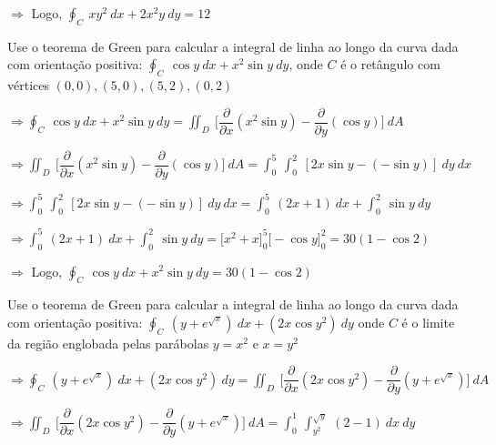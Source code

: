 \documentclass[11pt,a4paper]{article}
\begin{document}
\begin{enumerate}
{		$\Rightarrow$ Logo, $\displaystyle\oint_C\ xy^2\ dx + 2x^2y\ dy = 12$
		
		\item Use o teorema de Green para calcular a integral de linha ao longo da curva dada com orientação positiva: $\displaystyle\oint_C\ \cos y\ dx + x^2 \sin y\ dy$, onde $C$ é o retângulo com vértices $(0,0),(5,0),(5,2),(0,2)$
		
		$\Rightarrow \displaystyle\oint_C\ \cos y\ dx + x^2 \sin y\ dy = \displaystyle\iint_D\ \Bigg[\dfrac{\partial}{\partial x}(x^2\sin y) - \dfrac{\partial}{\partial y}(\cos y)\Bigg]\ dA $
		
		$\Rightarrow \displaystyle\iint_D\ \Bigg[\dfrac{\partial}{\partial x}(x^2\sin y) - \dfrac{\partial}{\partial y}(\cos y)\Bigg]\ dA = \displaystyle\int_{0}^{5}\ \displaystyle\int_{0}^{2}\ [2x\sin y - (-\sin y)]\ dy\ dx$
		
		$\Rightarrow \displaystyle\int_{0}^{5}\ \displaystyle\int_{0}^{2}\ [2x\sin y - (-\sin y)]\ dy\ dx = \displaystyle\int_{0}^{5}\ (2x + 1)\ dx + \displaystyle\int_{0}^{2}\ \sin y\ dy  $
		
		$\Rightarrow \displaystyle\int_{0}^{5}\ (2x + 1)\ dx + \displaystyle\int_{0}^{2}\ \sin y\ dy = \Big[x^2 + x\Big]_0^5 \Big[ - \cos y\Big]_0^2 = 30(1 - \cos 2)$
		
		$\Rightarrow$ Logo, $\displaystyle\oint_C\ \cos y\ dx + x^2 \sin y\ dy = 30(1 - \cos 2)$
		
		\item Use o teorema de Green para calcular a integral de linha ao longo da curva dada com orientação positiva: $\displaystyle\oint_C\ (y + e^{\sqrt{x}})\ dx + (2x \cos y^2)\ dy$ onde $C$ é o limite da região englobada pelas parábolas $y = x^2$ e $x = y^2$
		
		$\Rightarrow \displaystyle\oint_C\ (y + e^{\sqrt{x}})\ dx + (2x \cos y^2)\ dy = \displaystyle\iint_D\ \Bigg[\dfrac{\partial}{\partial x}(2x \cos y^2) - \dfrac{\partial}{\partial y}(y + e^{\sqrt{x}})\Bigg]\ dA $
		
		$\Rightarrow \displaystyle\iint_D\ \Bigg[\dfrac{\partial}{\partial x}(2x \cos y^2) - \dfrac{\partial}{\partial y}(y + e^{\sqrt{x}})\Bigg]\ dA = \displaystyle\int_{0}^{1}\ \displaystyle\int_{y^2}^{\sqrt{y}}\ (2 - 1)\ dx\ dy $
		
}
\end{enumerate}
\end{document}
